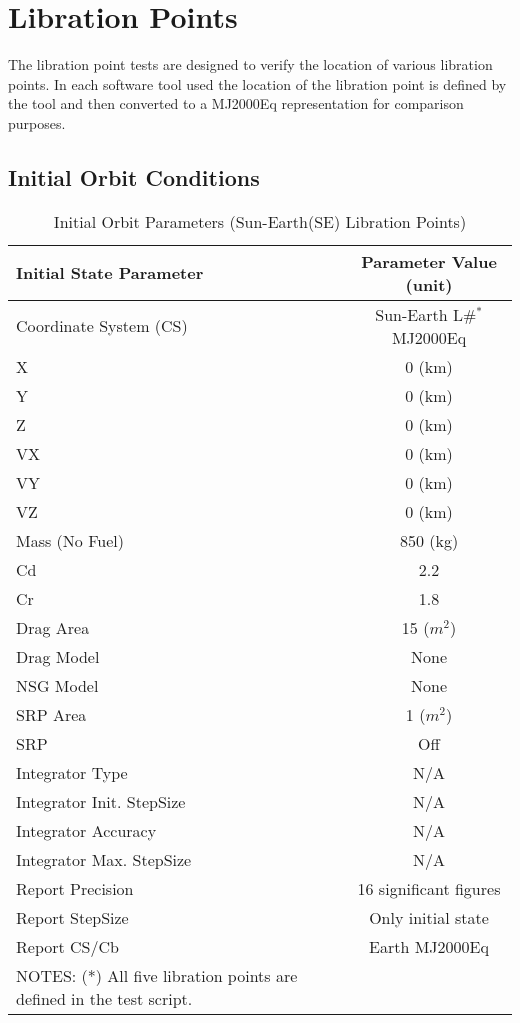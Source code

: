 \chapter{Libration Points}
\label{Ch:LibPoint}

The libration point tests are designed to verify the location of
various libration points. In each software tool used the location of
the libration point is defined by the tool and then converted to a
MJ2000Eq representation for comparison purposes.

\section{Initial Orbit Conditions}
\begin{table}[htbp!]
\centering \caption{Initial Orbit Parameters (Sun-Earth(SE)
Libration Points)}
      \begin{tabular}{lc}
      \hline\hline
            Initial State Parameter & Parameter Value (unit)\\
            \hline
            Coordinate System (CS) & Sun-Earth L\#$^*$ MJ2000Eq\\
            X & 0 (km)\\
            Y & 0 (km)\\
            Z & 0 (km)\\
            VX & 0 (km)\\
            VY & 0 (km)\\
            VZ & 0 (km)\\
            Mass (No Fuel) & 850 (kg)\\
            Cd & 2.2\\
            Cr & 1.8\\
            Drag Area & 15 ($m^2$)\\
            Drag Model & None\\
            NSG Model & None\\
            SRP Area & 1 ($m^2$)\\
            SRP & Off\\
            Integrator Type & N/A\\
            Integrator Init. StepSize & N/A\\
            Integrator Accuracy & N/A\\
            Integrator Max. StepSize & N/A\\
            Report Precision & 16 significant figures\\
            Report StepSize & Only initial state\\
            Report CS/Cb & Earth MJ2000Eq\\
      \hline\hline
      NOTES: (*) All five libration points are defined in the test
      script.
      \label{Table:InitialSEstate}
\end{tabular}
\end{table}

